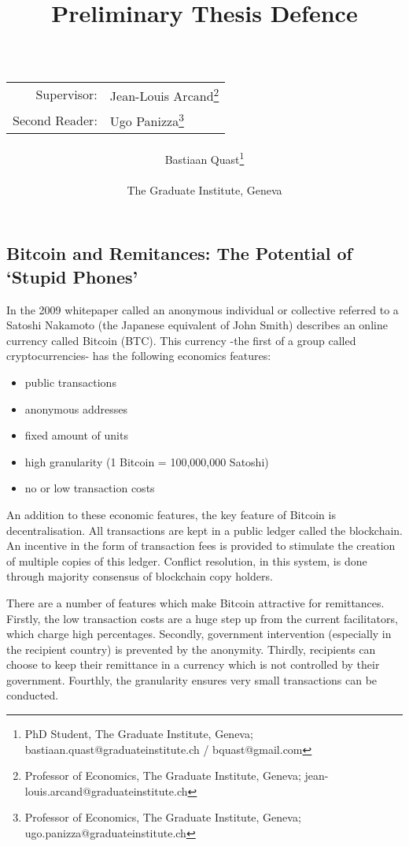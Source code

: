 \documentclass[a4paper]{report}
\title{Preliminary Thesis Defence\\~\\
\begin{tabular}{rl}
Supervisor:&Jean-Louis Arcand\footnote{Professor of Economics, The Graduate Institute, Geneva; jean-louis.arcand@graduateinstitute.ch}\\
Second Reader:&Ugo Panizza\footnote{Professor of Economics, The Graduate Institute, Geneva; ugo.panizza@graduateinstitute.ch}
\end{tabular}
}
\author{Bastiaan Quast\thanks{PhD Student, The Graduate Institute, Geneva; bastiaan.quast@graduateinstitute.ch / bquast@gmail.com}\\~\\
The Graduate Institute, Geneva}
\begin{document}
\maketitle
\tableofcontents







\begin{refsection}
\chapter{Bitcoin and Remitances: The Potential of `Stupid Phones'}
\label{btc}
In the 2009 whitepaper \parencite{nakamoto2008bitcoin} called  an anonymous individual or collective referred to a Satoshi Nakamoto (the Japanese equivalent of John Smith) describes an online currency called Bitcoin (BTC). 
This currency -the first of a group called cryptocurrencies- has the following economics features:

\begin{itemize}
\item public transactions
\item anonymous addresses
\item fixed amount of units
\item high granularity (1 Bitcoin = 100,000,000 Satoshi)
\item no or low transaction costs
\end{itemize}

An addition to these economic features, the key feature of Bitcoin is decentralisation.
All transactions are kept in a public ledger called the blockchain. An incentive in the form of transaction fees is provided to stimulate the creation of multiple copies of this ledger.
Conflict resolution, in this system, is done through majority consensus of blockchain copy holders.

There are a number of features which make Bitcoin attractive for remittances. Firstly, the low transaction costs are a huge step up from the current facilitators, which charge high percentages. Secondly, government intervention (especially in the recipient country) is prevented by the anonymity. Thirdly, recipients can choose to keep their remittance in a currency which is not controlled by their government. Fourthly, the granularity ensures very small transactions can be conducted.


\end{refsection}
\end{document}
